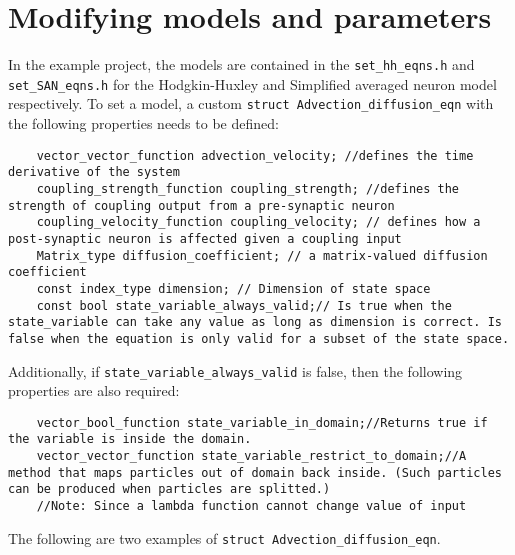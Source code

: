 \documentclass[10pt]{article} %
\begin{document}
\section{Modifying models and parameters}
\label{str:Advdiffeqn}
In the example project, the models are contained in the \texttt{set\_hh\_eqns.h} and \texttt{set\_SAN\_eqns.h} for the Hodgkin-Huxley and Simplified averaged neuron model respectively. To set a model, a custom \texttt{struct Advection\_diffusion\_eqn} with the following properties needs to be defined:
\begin{lstlisting}
    vector_vector_function advection_velocity; //defines the time derivative of the system
    coupling_strength_function coupling_strength; //defines the strength of coupling output from a pre-synaptic neuron
    coupling_velocity_function coupling_velocity; // defines how a post-synaptic neuron is affected given a coupling input
    Matrix_type diffusion_coefficient; // a matrix-valued diffusion coefficient
    const index_type dimension; // Dimension of state space
    const bool state_variable_always_valid;// Is true when the state_variable can take any value as long as dimension is correct. Is false when the equation is only valid for a subset of the state space.
\end{lstlisting}
Additionally, if \texttt{state\_variable\_always\_valid} is false, then the following properties are also required:
\begin{lstlisting}
    vector_bool_function state_variable_in_domain;//Returns true if the variable is inside the domain.
    vector_vector_function state_variable_restrict_to_domain;//A method that maps particles out of domain back inside. (Such particles can be produced when particles are splitted.)
    //Note: Since a lambda function cannot change value of input
\end{lstlisting}
The following are two examples of \texttt{struct Advection\_diffusion\_eqn}.
\end{document}
